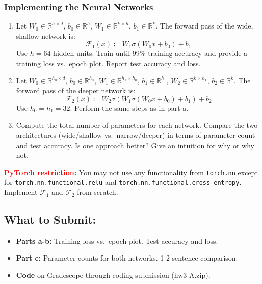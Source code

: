 \documentclass{article}
\begin{document}
\begin{aprob}
    \subsubsection*{Implementing the Neural Networks}
    \begin{enumerate}
        \item {}
        Let $W_0 \in \mathbb{R}^{h \times d}$, $b_0 \in \mathbb{R}^h$, $W_1 \in \mathbb{R}^{k \times h}$, $b_1 \in \mathbb{R}^k$.
        The forward pass of the wide, shallow network is:
        $$\mathcal{F}_1(x) \coloneqq W_1 \sigma(W_0 x + b_0) + b_1$$
        Use $h=64$ hidden units. Train until 99\% training accuracy and provide a training loss vs.\ epoch plot. Report test accuracy and loss.
        \item {}
        Let $W_0 \in \mathbb{R}^{h_0 \times d}$, $b_0 \in \mathbb{R}^{h_0}$, $W_1 \in \mathbb{R}^{h_1 \times h_0}$, $b_1 \in \mathbb{R}^{h_1}$,
        $W_2 \in \mathbb{R}^{k \times h_1}$, $b_2 \in \mathbb{R}^{k}$.
        The forward pass of the deeper network is:
        $$\mathcal{F}_2(x) \coloneqq W_2 \sigma(W_1 \sigma(W_0 x + b_0) + b_1) + b_2$$
        Use $h_0 = h_1 = 32$. Perform the same steps as in part a.
        \item {}
        Compute the total number of parameters for each network. Compare the two architectures (wide/shallow vs.\ narrow/deeper) in terms of parameter count and test accuracy. Is one approach better? Give an intuition for why or why not.
    \end{enumerate}

    \textcolor{red}{\textbf{PyTorch restriction:}} You may not use any functionality from \texttt{torch.nn} except for \texttt{torch.nn.functional.relu} and \texttt{torch.nn.functional.cross\_entropy}. Implement $\mathcal{F}_1$ and $\mathcal{F}_2$ from scratch.
    \subsection*{What to Submit:}
    \begin{itemize}
        \item \textbf{Parts a-b:} Training loss vs.\ epoch plot. Test accuracy and loss.
        \item \textbf{Part c:} Parameter counts for both networks. 1-2 sentence comparison.
        \item \textbf{Code} on Gradescope through coding submission (hw3-A.zip).
    \end{itemize}
\end{aprob}
\end{document}
